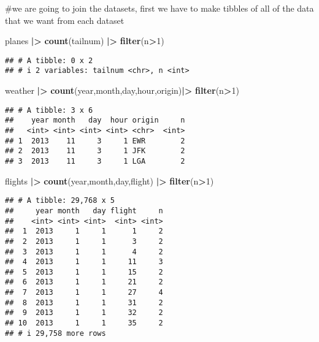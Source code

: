 \documentclass[
]{article}
\newenvironment{Shaded}{\begin{snugshade}}{\end{snugshade}}
\newcommand{\DecValTok}[1]{\textcolor[rgb]{0.00,0.00,0.81}{#1}}
\newcommand{\FunctionTok}[1]{\textcolor[rgb]{0.13,0.29,0.53}{\textbf{#1}}}
\newcommand{\NormalTok}[1]{#1}
\newcommand{\SpecialCharTok}[1]{\textcolor[rgb]{0.81,0.36,0.00}{\textbf{#1}}}
\begin{document}
\#we are going to join the datasets, first we have to make tibbles of
all of the data that we want from each dataset

\begin{Shaded}
\begin{Highlighting}[]
\NormalTok{planes }\SpecialCharTok{|\textgreater{}}
  \FunctionTok{count}\NormalTok{(tailnum) }\SpecialCharTok{|\textgreater{}}
  \FunctionTok{filter}\NormalTok{(n}\SpecialCharTok{\textgreater{}}\DecValTok{1}\NormalTok{)}
\end{Highlighting}
\end{Shaded}

\begin{verbatim}
## # A tibble: 0 x 2
## # i 2 variables: tailnum <chr>, n <int>
\end{verbatim}

\begin{Shaded}
\begin{Highlighting}[]
\NormalTok{weather }\SpecialCharTok{|\textgreater{}}
  \FunctionTok{count}\NormalTok{(year,month,day,hour,origin)}\SpecialCharTok{|\textgreater{}}
  \FunctionTok{filter}\NormalTok{(n}\SpecialCharTok{\textgreater{}}\DecValTok{1}\NormalTok{)}
\end{Highlighting}
\end{Shaded}

\begin{verbatim}
## # A tibble: 3 x 6
##    year month   day  hour origin     n
##   <int> <int> <int> <int> <chr>  <int>
## 1  2013    11     3     1 EWR        2
## 2  2013    11     3     1 JFK        2
## 3  2013    11     3     1 LGA        2
\end{verbatim}

\begin{Shaded}
\begin{Highlighting}[]
\NormalTok{flights }\SpecialCharTok{|\textgreater{}}
  \FunctionTok{count}\NormalTok{(year,month,day,flight) }\SpecialCharTok{|\textgreater{}}
  \FunctionTok{filter}\NormalTok{(n}\SpecialCharTok{\textgreater{}}\DecValTok{1}\NormalTok{)}
\end{Highlighting}
\end{Shaded}

\begin{verbatim}
## # A tibble: 29,768 x 5
##     year month   day flight     n
##    <int> <int> <int>  <int> <int>
##  1  2013     1     1      1     2
##  2  2013     1     1      3     2
##  3  2013     1     1      4     2
##  4  2013     1     1     11     3
##  5  2013     1     1     15     2
##  6  2013     1     1     21     2
##  7  2013     1     1     27     4
##  8  2013     1     1     31     2
##  9  2013     1     1     32     2
## 10  2013     1     1     35     2
## # i 29,758 more rows
\end{verbatim}
\end{document}
